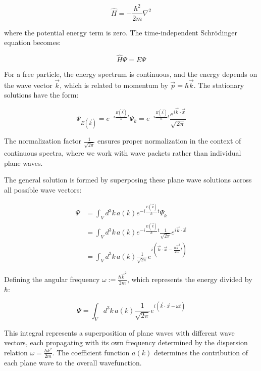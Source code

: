 \documentclass[italian]{HKNdocument}
\begin{document}
\begin{equation*}
\hat{H} = -\frac{\hbar^2}{2m}\nabla^2 \tag{3.2}
\end{equation*}

where the potential energy term is zero. The time-independent Schrödinger equation becomes:

\begin{equation*}
\hat{H}\Psi = E\Psi \tag{3.3}
\end{equation*}

For a free particle, the energy spectrum is continuous, and the energy depends on the wave vector $\vec{k}$, which is related to momentum by $\vec{p} = \hbar\vec{k}$. The stationary solutions have the form:

\begin{equation*}
\Psi_{E(\vec{k})} = e^{-i\frac{E(\vec{k})}{\hbar}t}\Psi_k = e^{-i\frac{E(\vec{k})}{\hbar}t}\frac{e^{i\vec{k}\cdot\vec{x}}}{\sqrt{2\pi}} \tag{3.4}
\end{equation*}

The normalization factor $\frac{1}{\sqrt{2\pi}}$ ensures proper normalization in the context of continuous spectra, where we work with wave packets rather than individual plane waves.

The general solution is formed by superposing these plane wave solutions across all possible wave vectors:

\begin{align*}
\Psi &= \int_V d^3k\,a(k)e^{-i\frac{E(\vec{k})}{\hbar}t}\Psi_k \\
&= \int_V d^3k\,a(k)e^{-i\frac{E(\vec{k})}{\hbar}t}\frac{1}{\sqrt{2\pi}}e^{i\vec{k}\cdot\vec{x}} \tag{3.5} \\
&= \int_V d^3k\,a(k)\frac{1}{\sqrt{2\pi}}e^{i\left(\vec{k}\cdot\vec{x} - \frac{\hbar\vec{k}^2}{2m}t\right)}
\end{align*}

Defining the angular frequency $\omega := \frac{\hbar\vec{k}^2}{2m}$, which represents the energy divided by $\hbar$:

\begin{equation*}
\Psi = \int_V d^3k\,a(k)\frac{1}{\sqrt{2\pi}}e^{i(\vec{k}\cdot\vec{x} - \omega t)} \tag{3.6}
\end{equation*}

This integral represents a superposition of plane waves with different wave vectors, each propagating with its own frequency determined by the dispersion relation $\omega = \frac{\hbar k^2}{2m}$. The coefficient function $a(k)$ determines the contribution of each plane wave to the overall wavefunction.
\end{document}
